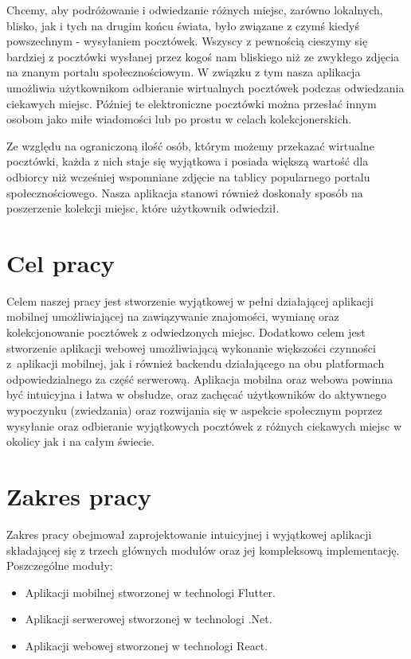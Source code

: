 \documentclass[a4paper,twoside,12pt]{book}
\begin{document}
Chcemy, aby podróżowanie i odwiedzanie różnych miejsc, zarówno lokalnych, blisko, jak i tych na drugim końcu świata, było związane z czymś kiedyś powszechnym - wysyłaniem pocztówek. Wszyscy z pewnością cieszymy się bardziej z pocztówki wysłanej przez kogoś nam bliskiego niż ze zwykłego zdjęcia na znanym portalu społecznościowym. W związku z tym nasza aplikacja umożliwia użytkownikom odbieranie wirtualnych pocztówek podczas odwiedzania ciekawych miejsc. Później te elektroniczne pocztówki można przesłać innym osobom jako miłe wiadomości lub po prostu w celach kolekcjonerskich.

Ze względu na ograniczoną ilość osób, którym możemy przekazać wirtualne pocztówki, każda z nich staje się wyjątkowa i posiada większą wartość dla odbiorcy niż wcześniej wspomniane zdjęcie na tablicy popularnego portalu społecznościowego. Nasza aplikacja stanowi również doskonały sposób na poszerzenie kolekcji miejsc, które użytkownik odwiedził.

\newpage

\section{Cel pracy}
Celem naszej pracy jest stworzenie wyjątkowej w pełni działającej aplikacji mobilnej umożliwiającej na zawiązywanie znajomości, wymianę oraz kolekcjonowanie pocztówek z odwiedzonych miejsc. Dodatkowo celem jest stworzenie aplikacji webowej umożliwiającą wykonanie większości czynności z~aplikacji mobilnej, jak i również backendu działającego na obu platformach odpowiedzialnego za część serwerową. Aplikacja mobilna oraz webowa powinna być intuicyjna i łatwa w obsłudze, oraz zachęcać użytkowników do aktywnego wypoczynku (zwiedzania) oraz rozwijania się w aspekcie społecznym poprzez wysyłanie oraz odbieranie wyjątkowych pocztówek z różnych ciekawych miejsc w okolicy jak i na całym świecie.

\section{Zakres pracy}
Zakres pracy obejmował zaprojektowanie intuicyjnej i wyjątkowej aplikacji składającej się z trzech głównych modułów oraz jej kompleksową implementację.
\\
Poszczególne moduły:
\begin{itemize}
    \item Aplikacji mobilnej stworzonej w technologi Flutter.
    \item Aplikacji serwerowej stworzonej w technologi .Net.
    \item Aplikacji webowej stworzonej w technologi React.
\end{itemize}
\end{document}
